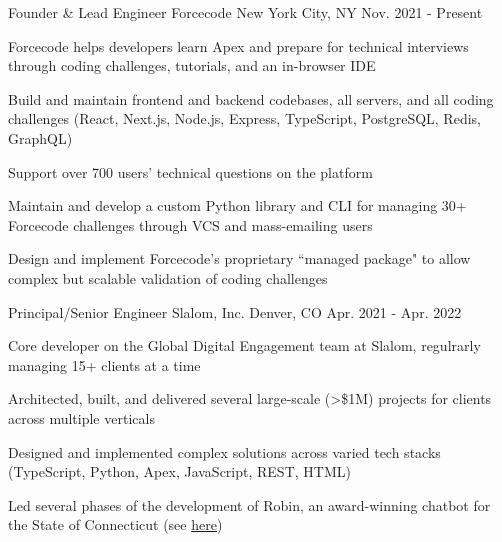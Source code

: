 \begin{cventries}
  \cventry
    {Founder \& Lead Engineer} %
    {Forcecode} %
    {New York City, NY} %
    {Nov. 2021 - Present} %
    {
      \begin{cvitems} %
        \item {Forcecode helps developers learn Apex and prepare for technical interviews through coding challenges, tutorials, and an in-browser IDE}
        \item {Build and maintain frontend and backend codebases, all servers, and all coding challenges (React, Next.js, Node.js, Express, TypeScript, PostgreSQL, Redis, GraphQL)}
        \item {Support over 700 users' technical questions on the platform}
        \item {Maintain and develop a custom Python library and CLI for managing 30+ Forcecode challenges through VCS and mass-emailing users}
        \item {Design and implement Forcecode's proprietary ``managed package" to allow complex but scalable validation of coding challenges}
      \end{cvitems}
    }


  \cventry
    {Principal/Senior Engineer} %
    {Slalom, Inc.} %
    {Denver, CO} %
    {Apr. 2021 - Apr. 2022} %
    {
      \begin{cvitems} %
        \item {Core developer on the Global Digital Engagement team at Slalom, regulrarly managing 15+ clients at a time}
        \item {Architected, built, and delivered several large-scale (>\$1M) projects for clients across multiple verticals}
        \item {Designed and implemented complex solutions across varied tech stacks (TypeScript, Python, Apex, JavaScript, REST, HTML)}
        \item {Led several phases of the development of Robin, an award-winning chatbot for the State of Connecticut (see \href{https://portal.ct.gov/das/dasblog/das-team-wins-government-experience-award}{\color{awesome-skyblue}here})}
      \end{cvitems}
    }


\end{cventries}
